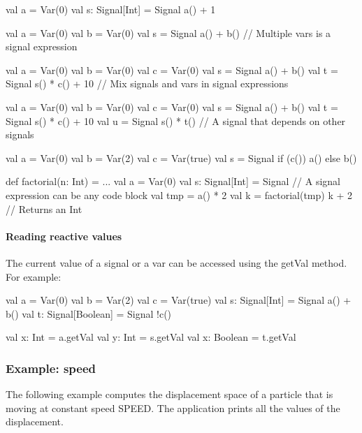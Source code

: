 \documentclass[10pt,a4paper]{article}
\newcommand{\code}[1]{{\fontfamily{cmtt}\small\selectfont#1}}
\begin{document}
\begin{codenv}
val a = Var(0) 
val s: Signal[Int] = Signal{ a() + 1 }
\end{codenv}

\begin{codenv}
val a = Var(0) 
val b = Var(0) 
val s = Signal{ a() + b() } // Multiple vars is a signal expression
\end{codenv}

\begin{codenv}
val a = Var(0) 
val b = Var(0)
val c = Var(0)
val s = Signal{ a() + b() }
val t = Signal{ s() * c() + 10 } // Mix signals and vars in signal expressions
\end{codenv}

\begin{codenv}
val a = Var(0) 
val b = Var(0)
val c = Var(0)
val s = Signal{ a() + b() }
val t = Signal{ s() * c() + 10 }
val u = Signal{ s() * t() } // A signal that depends on other signals
\end{codenv}


\begin{codenv}
val a = Var(0) 
val b = Var(2)
val c = Var(true)
val s = Signal{ if (c()) a() else b() }
\end{codenv}

\begin{codenv}
def factorial(n: Int) = ...
val a = Var(0) 
val s: Signal[Int] = Signal{ // A signal expression can be any code block
  val tmp = a() * 2
  val k = factorial(tmp)
  k + 2  // Returns an Int
}
\end{codenv}




\paragraph{Reading reactive values} The current value of a signal or a
var can be accessed using the \code{getVal} method. For example:

\begin{codenv}
val a = Var(0) 
val b = Var(2)
val c = Var(true)
val s: Signal[Int] = Signal{ a() + b() }
val t: Signal[Boolean] = Signal{ !c() }

val x: Int = a.getVal 
val y: Int = s.getVal 
val x: Boolean = t.getVal 
\end{codenv}



\subsubsection{Example: speed}
The following example computes the displacement \code{space} of a
particle that is moving at constant speed \code{SPEED}. The
application prints all the values of the displacement.
\end{document}
